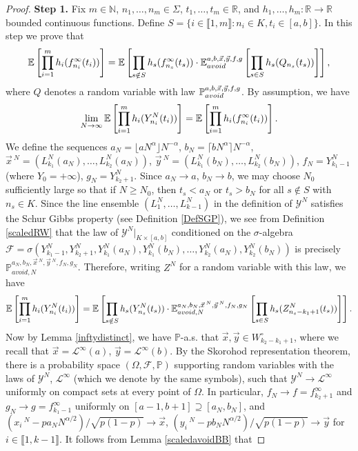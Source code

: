 \begin{proof}
	\noindent\textbf{Step 1. } Fix $m\in\mathbb{N}$, $n_1,\dots,n_m\in\Sigma$, $t_1,\dots,t_m\in\mathbb{R}$, and $h_1,\dots,h_m : \mathbb{R}\to\mathbb{R}$ bounded continuous functions. Define $S = \{i\in\llbracket 1,m\rrbracket : n_i \in K, t_i \in [a,b]\}$. In this step we prove that
	\begin{equation}\label{BBcondexsplit}
		\mathbb{E}\left[\prod_{i=1}^m h_i(f^\infty_{n_i}(t_i))\right] = \mathbb{E}\left[\prod_{s\notin S} h_s(f^\infty_{n_s}(t_s))\cdot\mathbb{E}^{a,b,\vec{x},\vec{y},f,g}_{avoid}\left[\prod_{s\in S} h_s(Q_{n_s}(t_s))\right]\right],
	\end{equation}
	where $Q$ denotes a random variable with law $\mathbb{P}^{a,b,\vec{x},\vec{y},f,g}_{avoid}$. By assumption, we have
	\begin{equation}\label{BGPweak}
		\lim_{N\to\infty}\mathbb{E}\left[\prod_{i=1}^m h_i(Y^N_{n_i}(t_i))\right] = \mathbb{E}\left[\prod_{i=1}^m h_i(f^\infty_{n_i}(t_i))\right].
	\end{equation}
	We define the sequences $a_N = \lfloor aN^\alpha\rfloor N^{-\alpha}$, $b_N = \lceil bN^\alpha\rceil N^{-\alpha}$, $\vec{x}\,^N = (L_{k_1}^N(a_N),\dots,L_{k_2}^N(a_N))$, $\vec{y}\,^N = (L_{k_1}^N(b_N),\dots,L_{k_2}^N(b_N))$, $f_N = Y_{k_1-1}^N$ (where $Y_0 = +\infty$), $g_N = Y_{k_2+1}^N$. Since $a_N \to a$, $b_N\to b$, we may choose $N_0$ sufficiently large so that if $N\geq N_0$, then $t_s < a_N$ or $t_s > b_N$ for all $s\notin S$ with $n_s \in K$. Since the line ensemble $(L_1^N,\dots,L_{k-1}^N)$ in the definition of $\mathcal{Y}^N$ satisfies the Schur Gibbs property (see Definition \ref{DefSGP}), we see from Definition \ref{scaledRW} that the law of $\mathcal{Y}^N|_{K\times[a,b]}$ conditioned on the $\sigma$-algebra $\mathcal{F} = \sigma\left(Y^N_{k_1-1}, Y^N_{k_2+1}, Y^N_{k_1}(a_N), Y^N_{k_1}(b_N),\dots,Y^N_{k_2}(a_N),Y^N_{k_2}(b_N)\right)$ is precisely $\mathbb{P}^{a_N,b_N,\vec{x}\,^N,\vec{y}\,^N,f_N,g_N}_{avoid,N}$. Therefore, writing $Z^N$ for a random variable with this law, we have
	\begin{equation}\label{BBschur}
		\mathbb{E}\left[\prod_{i=1}^m h_i(Y^N_{n_i}(t_i))\right] = \mathbb{E}\left[\prod_{s\notin S} h_s(Y^N_{n_s}(t_s))\cdot\mathbb{E}^{a_N,b_N,\vec{x}\,^N,\vec{y}\,^N,f_N,g_N}_{avoid,N}\left[\prod_{s\in S} h_s(Z^N_{n_s-k_1+1}(t_s))\right]\right].
	\end{equation}
	Now by Lemma \ref{inftydistinct}, we have $\mathbb{P}$-a.s. that $\vec{x},\vec{y} \in W_{k_2-k_1+1}^\circ$, where we recall that $\vec{x} = \mathcal{L}^\infty(a)$, $\vec{y} = \mathcal{L}^\infty(b)$. By the Skorohod representation theorem, there is a probability space $(\Omega,\mathcal{F},\mathbb{P})$ supporting random variables with the laws of $\mathcal{Y}^N$, $\mathcal{L}^\infty$ (which we denote by the same symbols), such that $\mathcal{Y}^N \to \mathcal{L}^\infty$ uniformly on compact sets at every point of $\Omega$. In particular, $f_N\to f = f^\infty_{k_2+1}$ and $g_N\to g = f^\infty_{k_1-1}$ uniformly on $[a-1,b+1]\supseteq [a_N,b_N]$, and $(x_i\,^N - pa_N N^{\alpha/2})/\sqrt{p(1-p)}\to\vec{x}$, $(y_i\,^N-pb_N N^{\alpha/2})/\sqrt{p(1-p)}\to\vec{y}$ for $i\in\llbracket 1,k-1\rrbracket$. It follows from Lemma \ref{scaledavoidBB} that 

\end{proof}
